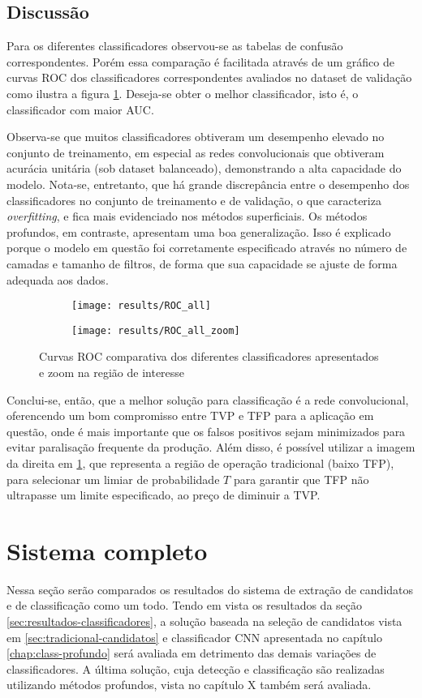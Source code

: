 \subsection{Discussão}
Para os diferentes classificadores observou-se as tabelas de confusão correspondentes. Porém essa comparação é facilitada através de um gráfico de curvas ROC dos classificadores correspondentes avaliados no dataset de validação como ilustra a figura \ref{fig:ROC}. Deseja-se obter o melhor classificador, isto é, o classificador com maior AUC. 

Observa-se que muitos classificadores obtiveram um desempenho elevado no conjunto de treinamento, em especial as redes convolucionais que obtiveram acurácia unitária (sob dataset balanceado), demonstrando a alta capacidade do modelo. Nota-se, entretanto, que há grande discrepância entre o desempenho dos classificadores no conjunto de treinamento e de validação, o que caracteriza \textit{overfitting}, e fica mais evidenciado nos métodos superficiais. Os métodos profundos, em contraste, apresentam uma boa generalização. Isso é explicado porque o modelo em questão foi corretamente especificado através no número de camadas e tamanho de filtros, de forma que sua capacidade se ajuste de forma adequada aos dados.

\begin{figure}[ht]
\centering
\begin{subfigure}{.5\textwidth}
  \centering
  \texttt{[image: results/ROC\_all]}
\end{subfigure}%
\begin{subfigure}{.5\textwidth}
  \centering
  \texttt{[image: results/ROC\_all\_zoom]}
\end{subfigure}
\caption{Curvas ROC comparativa dos diferentes classificadores apresentados e zoom na região de interesse}
\label{fig:ROC}
\end{figure}

Conclui-se, então, que a melhor solução para classificação é a rede convolucional, oferencendo um bom compromisso entre TVP e TFP para a aplicação em questão, onde é mais importante que os falsos positivos sejam minimizados para evitar paralisação frequente da produção. Além disso, é possível utilizar a imagem da direita em \ref{fig:ROC}, que representa a região de operação tradicional (baixo TFP), para selecionar um limiar de probabilidade $T$ para garantir que TFP não ultrapasse um limite especificado, ao preço de diminuir a TVP.

\section{Sistema completo}
Nessa seção serão comparados os resultados do sistema de extração de candidatos e de classificação como um todo. Tendo em vista os resultados da seção \ref{sec:resultados-classificadores}, a solução baseada na seleção de candidatos vista em \ref{sec:tradicional-candidatos} e classificador CNN apresentada no capítulo \ref{chap:class-profundo} será avaliada em detrimento das demais variações de classificadores. A última solução, cuja detecção e classificação são realizadas utilizando métodos profundos, vista no capítulo X também será avaliada.
